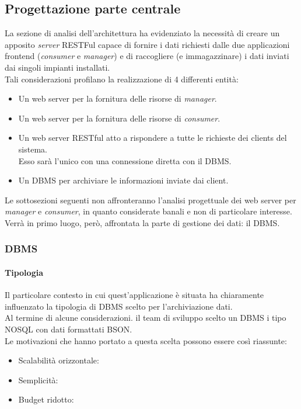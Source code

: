 \documentclass[12pt]{article}
\begin{document}
\subsection{Progettazione parte centrale}
La sezione di analisi dell'architettura ha evidenziato la necessità di creare un apposito \textit{server} RESTFul capace di fornire i dati richiesti dalle due applicazioni frontend (\textit{consumer} e \textit{manager}) e di raccogliere (e immagazzinare) i dati inviati dai singoli impianti installati.\\
Tali considerazioni profilano la realizzazione di 4 differenti entità:
\begin{itemize}
	\item Un web server per la fornitura delle risorse di \textit{manager}.
	\item Un web server per la fornitura delle risorse di \textit{consumer}.
	\item Un web server RESTful atto a rispondere a tutte le richieste dei clients del sistema.\\Esso sarà l'unico con una connessione diretta con il DBMS.
	\item Un DBMS per archiviare le informazioni inviate dai client.
\end{itemize}
Le sottosezioni seguenti non affronteranno l'analisi progettuale dei web server per \textit{manager} e \textit{consumer}, in quanto considerate banali e non di particolare interesse.\\ 
Verrà in primo luogo, però, affrontata la parte di gestione dei dati: il DBMS.
\subsubsection{DBMS}
\paragraph{Tipologia}
Il particolare contesto in cui quest'applicazione è situata ha chiaramente influenzato la tipologia di DBMS scelto per l'archiviazione dati.\\
Al termine di alcune considerazioni. il team di sviluppo scelto un DBMS i tipo NOSQL con dati formattati BSON.\\Le motivazioni che hanno portato a questa scelta possono essere così riassunte: 
\begin{itemize}
\item Scalabilità orizzontale: %
\item Semplicità: %
\item Budget ridotto: %
\end{itemize}
\end{document}
